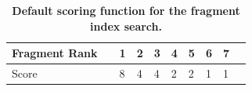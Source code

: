 \documentclass[pdflatex,sn-nature]{sn-jnl}
\begin{document}
\begin{table}[h]
    \centering
    \begin{tabular}{@{}ll|llllllll@{}}
    \toprule
        Fragment Rank & & 1 & 2 & 3 & 4 & 5 & 6 & 7 \\
    \midrule
        Score & & 8 & 4 & 4 & 2 & 2 & 1 & 1 \\
    \bottomrule
    \end{tabular}
    \caption{\textbf{Default scoring function for the fragment index search.}}
    \label{tab:frag_score}
\end{table}


\newpage

\end{document}
